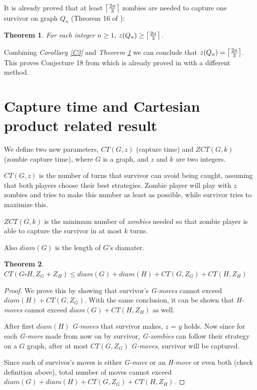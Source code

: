 \documentclass[1p]{elsarticle}
\DeclarePairedDelimiter\ceil{\lceil}{\rceil} \DeclarePairedDelimiter\floor{\lfloor}{\rfloor}
\newtheorem{theorem}{Theorem}
\begin{document}
It is already proved that at least $\ceil*{\frac{2n}{3}}$ zombies are needed to capture one survivor on graph $Q_n$
(Theorem 16 of \cite{Fitz16}):

\begin{theorem}
	\label{T4}
	For each integer $n \geq 1$, $z(Q_n) \geq \ceil*{\frac{2n}{3}} $.
\end{theorem}

Combining {\it Corollary \ref{C3}} and {\it Theorem \ref{T4}} we can conclude that $z(Q_n)  = \ceil*{\frac{2n}{3}}$.
This proves Conjecture 18 from \cite{Fitz16} which is already proved in \cite{Offner19} with a different method. 
	

\section{Capture time and Cartesian product related result}\label{capturetime}
	We define two new parameters, $CT(G,z)$ (capture time) and $ZCT(G,k)$ (zombie capture time), where $G$ is a graph,
	and $z$ and $k$ are two integers.
	
	$CT(G,z)$ is the number of turns that survivor can avoid being caught, assuming that both players choose their best
	strategies. Zombie player will play with $z$ zombies and tries to make this number as least as possible, while
	survivor tries to maximize this.

	$ZCT(G,k)$ is the minimum number of {\it zombies} needed so that zombie player is able to capture the survivor in at
	most $k$ turns.

	Also $diam(G)$ is the length of $G$'s diamater.
	\begin{theorem}
		\label{T5}
		$CT( G \square H, Z_G + Z_H ) \leq diam(G) + diam(H) + CT(G, Z_G) + CT(H, Z_H)$
	\end{theorem}
	\begin{proof}
		We prove this by showing that survivor's {\it G-moves} cannot exceed $diam(H) + CT(G, Z_G)$. With the same
		conclusion, it can be shown that {\it H-moves} cannot exceed $diam(G) + CT(H, Z_H)$ as well.

		After first $diam(H)$ {\it G-moves} that survivor makes, $z$ = $y$ holds. Now since for each {\it G-move} made
		from now on by survivor, {\it G-zombies} can follow their strategy on a $G$ graph, after at most $CT(G,Z_G)$
		{\it G-moves}, survivor will be captured. 
		
		Since each of survivor's moves is either {\it G-move} or an {\it H-move} or even both (check definition above),
		total number of moves cannot exceed $diam(G) + diam(H) + CT(G, Z_G) + CT(H, Z_H)$.
	\end{proof}
\end{document}
